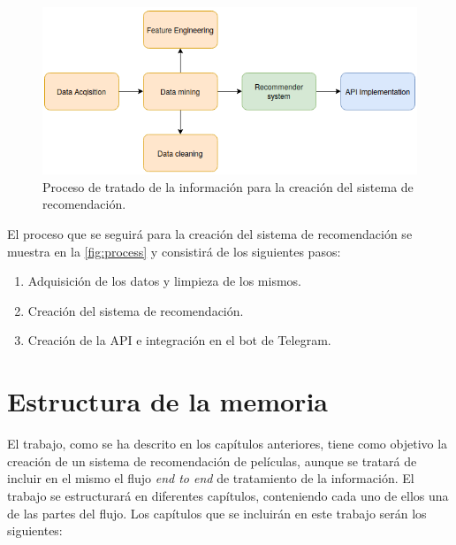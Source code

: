 \begin{figure}[h]
    \centering
    \captionsetup{width=10cm}
    \includegraphics[width=12cm]{contenido/imagenes/initial.png}
    \caption{Proceso de tratado de la información para la creación del sistema de recomendación.}
    \label{fig:process}
\end{figure}

El proceso que se seguirá para la creación del sistema de recomendación se muestra en la \autoref{fig:process} y consistirá de los siguientes pasos:
\begin{enumerate}
    \item Adquisición de los datos y limpieza de los mismos.
    \item Creación del sistema de recomendación.
    \item Creación de la API e integración en el bot de Telegram.
\end{enumerate}
\section{Estructura de la memoria}\label{sec:estructura}

El trabajo, como se ha descrito en los capítulos anteriores, tiene como objetivo la creación de un sistema de recomendación de películas, aunque se tratará de incluir en el mismo el flujo \textit{end to end} de tratamiento de la información. El trabajo se estructurará en diferentes capítulos, conteniendo cada uno de ellos una de las partes del flujo. Los capítulos que se incluirán en este trabajo serán los siguientes:

